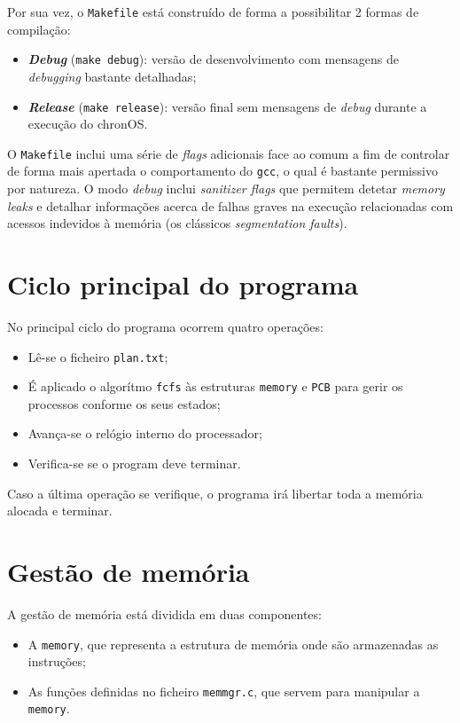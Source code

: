 \documentclass[a4paper,11pt,onecolumn,oneside]{article}
\newcommand{\chronOS}{\textsf{chronOS}}
\begin{document}
	Por sua vez, o \texttt{Makefile} está construído de forma a possibilitar 2 formas de compilação:
	
	\begin{itemize}
		\item \textbf{\textit{Debug}} (\verb|make debug|): versão de desenvolvimento com mensagens de \textit{debugging} bastante detalhadas;
		
		\item \textbf{\textit{Release}} (\verb|make release|): versão final sem mensagens de \textit{debug} durante a execução do \chronOS.
	\end{itemize}

	O \texttt{Makefile} inclui uma série de \textit{flags} adicionais face ao comum a fim de controlar de forma mais apertada o comportamento do \texttt{\ac{gcc}}, o qual é bastante permissivo por natureza. O modo \textit{debug} inclui \textit{sanitizer flags} que permitem detetar \textit{memory leaks} e detalhar informações acerca de falhas graves na execução relacionadas com acessos indevidos à memória (os clássicos \textit{segmentation faults}).
	
	
	\section{Ciclo principal do programa}
	\label{sec:main}
	No principal ciclo do programa ocorrem quatro operações:
	\begin{itemize}
	    \item Lê-se o ficheiro \verb|plan.txt|;
	    \item É aplicado o algorítmo \texttt{\ac{fcfs}} às estruturas \texttt{memory} e \texttt{\ac{PCB}} para gerir os processos conforme os seus estados;
	    \item Avança-se o relógio interno do processador;
	    \item Verifica-se se o program deve terminar.
	 \end{itemize}  
	    Caso a última operação se verifique, o programa irá libertar toda a memória alocada e terminar.
	    
	    
	\section{Gestão de memória}
	\label{sec:memory}
	A gestão de memória está dividida em duas componentes:
	\begin{itemize}
	    \item A \verb|memory|, que representa a estrutura de memória onde são armazenadas as instruções;
	    \item As funções definidas no ficheiro \verb|memmgr.c|, que servem para manipular a \verb|memory|.
	\end{itemize}
	
\end{document}
